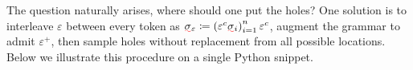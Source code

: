 \documentclass[sigplan,review,anonymous,acmsmall]{acmart}\settopmatter{printfolios=false,printccs=false,printacmref=false}
\begin{document}
  The question naturally arises, where should one put the holes? One solution is to interleave $\varepsilon$ between every token as $\err{\sigma}_\varepsilon\coloneqq \left(\varepsilon^c\err{\sigma}_i\right)_{i=1}^n\varepsilon^c$, augment the grammar to admit $\varepsilon^+$, then sample holes without replacement from all possible locations. Below we illustrate this procedure on a single Python snippet.

%
%
%
\end{document}
